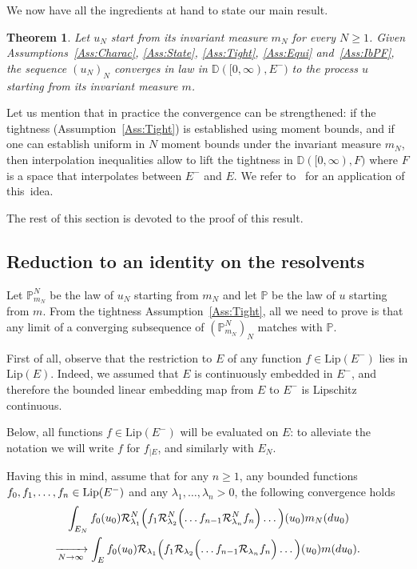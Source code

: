 \documentclass[10pt]{amsart}
\newtheorem{theo}{Theorem}[section]
\theoremstyle{definition}\newtheorem{defi}[theo]{Definition}\newtheorem{rema}[theo]{Remark}\newtheorem{exam}[theo]{Example}\newtheorem{exem}[theo]{Example}\newtheorem{nota}[theo]{Notation}
\theoremstyle{plain}
\newcommand{\bbD}{\mathbb{D}}
\newcommand{\bbP}{\mathbb{P}}
\newcommand{\cR}{\mathcal{R}}
\newcommand*\Lip{\mathrm{Lip}}
\renewcommand*{\to}{\mathchoice{\longrightarrow}{\rightarrow}{\rightarrow}{\rightarrow}}
\begin{document}
We now have all the ingredients at hand to state our main result.

\begin{theo}\label{Th:BlackBox}
Let $u_N$ start from its invariant measure $m_N$ for every $N\ge 1$. Given Assumptions~\ref{Ass:Charac}, \ref{Ass:State}, \ref{Ass:Tight}, \ref{Ass:Equi} and~\ref{Ass:IbPF}, the sequence $(u_N)_N$ converges in law in $\bbD([0,\infty), E^{-})$ to the process $u$ starting from its invariant measure $m$.
\end{theo}

Let us mention that in practice the convergence can be strengthened: if the tightness (Assumption~\ref{Ass:Tight}) is established using moment bounds, and if one can establish uniform in $N$ moment bounds under the invariant measure $m_N$, then interpolation inequalities allow to lift the tightness in $\bbD([0,\infty), F)$ where $F$ is a space that interpolates between $E^-$ and $E$. We refer to~\cite[Lemma~5.2]{DebZam} for an application of this~idea.


The rest of this section is devoted to the proof of this result.

\subsection{Reduction to an identity on the resolvents}\label{Subsec:Reduction}

Let $\bbP_{m_N}^{N}$ be the law of $u_N$ starting from $m_N$ and let $\bbP$ be the law of $u$ starting from $m$. From the tightness Assumption~\ref{Ass:Tight}, all we need to prove is that any limit of a converging subsequence of $(\bbP_{m_N}^{N})_N$ matches with $\bbP$.

First of all, observe that the restriction to $E$ of any function $f \in \Lip(E^-)$ lies in $\Lip(E)$. Indeed, we assumed that $E$ is continuously embedded in $E^-$, and therefore the bounded linear embedding map from $E$ to $E^-$ is Lipschitz continuous.

Below, all functions $f\in \Lip(E^-)$ will be evaluated on $E$: to alleviate the notation we will write $f$ for $f_{\mid E}$, and similarly with $E_N$.

Having this in mind, assume that for any $n\geq 1$, any bounded functions $f_0,f_1,\dots,\linebreak f_n\in\Lip(E^-)$ and any $\lambda_1,\dots,\lambda_n >0$, the following convergence holds
\begin{multline}\label{Eq:RecurResolv}
{}\int_{E_N} f_0(u_0)\cR^N_{\lambda_1} \Bigl(f_1\cR^N_{\lambda_2} \Bigl(\dots f_{n-1} \cR^N_{\lambda_n} f_n\Bigr)\dots\Bigr) (u_0) m_N(du_0)\\
\xrightarrow[N\to\infty]{}
\int_{E} f_0(u_0)\cR_{\lambda_1} \Bigl(f_1\cR_{\lambda_2} \Bigl(\dots f_{n-1} \cR_{\lambda_n} f_n\Bigr)\dots\Bigr) (u_0) m(du_0).
\end{multline}
\end{document}
